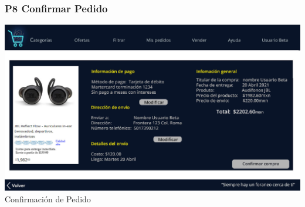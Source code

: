 \documentclass[14pt]{article}
\begin{document}
            \newpage
            \subsubsection{P8 Confirmar Pedido}\label{P8 Confirmar Pedido}
                \begin{center}
                    \includegraphics[height=0.55\textwidth]{ConfirmacionDePedido.jpg}
                    \label{fig:ConfirmacionDePedido} \\ [Figura 8] Confirmación de Pedido
                \end{center}
\end{document}
